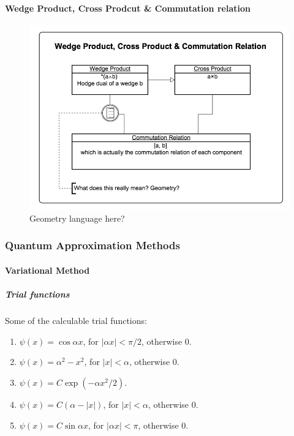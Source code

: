 \documentclass[letterpaper,10pt,english]{sphinxmanual}
\begin{document}
\paragraph{Wedge Product, Cross Prodcut \& Commutation relation}
\label{Quantum/questions:wedge-product-cross-prodcut-commutation-relation}\begin{figure}[htbp]
\centering
\capstart

\includegraphics{commutationCrossWedge.png}
\caption{Geometry language here?}\end{figure}


\subsubsection{Quantum Approximation Methods}
\label{Quantum/approx::doc}\label{Quantum/approx:quantum-approximation-methods}

\paragraph{Variational Method}
\label{Quantum/approx:variational-method}

\subparagraph{Trial functions}
\label{Quantum/approx:trial-functions}
Some of the calculable trial functions:
\begin{enumerate}
\item {} 
\(\psi(x) = \cos\alpha x\), for \(|\alpha x|<\pi/2\), otherwise 0.

\item {} 
\(\psi(x) = \alpha^2 - x^2\), for \(|x|<\alpha\), otherwise 0.

\item {} 
\(\psi(x) = C \exp(-\alpha x^2/2)\).

\item {} 
\(\psi(x) = C(\alpha - |x|)\), for \(|x|<\alpha\), otherwise 0.

\item {} 
\(\psi(x) = C\sin\alpha x\), for \(|\alpha x|<\pi\), otherwise 0.

\end{enumerate}
\end{document}
